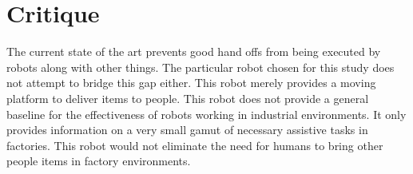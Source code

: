 \documentclass{article}
\begin{document}
\section*{Critique}
The current state of the art prevents good hand offs from being executed by robots along with other things. The particular robot chosen for this study does not attempt to bridge this gap either. This robot merely provides a moving platform to deliver items to people. This robot does not provide a general baseline for the effectiveness of robots working in industrial environments. It only provides information on a very small gamut of necessary assistive tasks in factories. This robot would not eliminate the need for humans to bring other people items in factory environments.
\cite{Szafir:2014:CIA:2559636.2559672}
\end{document}

